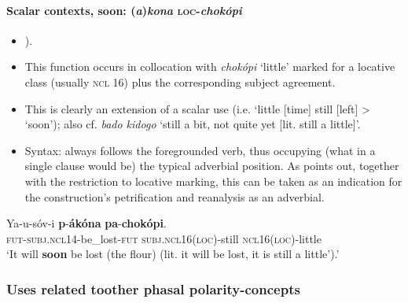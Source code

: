 \paragraph{Scalar contexts, soon: (\textit{a})\textit{kona} \textsc{loc}-\textit{chokópi}}\label{appendixMandaSoon}
\begin{itemize}
	\item \textcite{Bernander2021}).
	\item This function occurs in collocation with \textit{chokópi} \lq little' marked for a locative class (usually \textsc{ncl} 16) plus the corresponding subject agreement.
	\item This is clearly an extension of a scalar use (i.e. \lq little [time] still [left] > \lq soon'); also cf.  \textit{bado kidogo} \lq still a bit, not quite yet [lit. still a little]'.
	\item Syntax: always follows the foregrounded verb, thus occupying (what in a single clause would be) the typical adverbial position. As \textcite{Bernander2021} points out, together with the restriction to locative marking, this can be taken as an indication for the construction's petrification and reanalysis as an adverbial. 
\end{itemize}

\begin{exe}
	\ex
	\gll Ya-u-sóv-i \textbf{p}-\textbf{ákóna} \textbf{pa}-\textbf{chokópi}.\\
	\textsc{fut}-\textsc{subj}.\textsc{ncl}14-be\_lost-\textsc{fut} \textsc{subj}.\textsc{ncl}16(\textsc{loc})-still \textsc{ncl}16(\textsc{loc})-little\\
	\glt \lq It will \textbf{soon} be lost (the flour) (lit. it will be lost, it is still a little\rq{}).\rq{ }\parencite[58]{Bernander2021}
\end{exe}


\subsubsection{Uses related toother phasal polarity-concepts}
